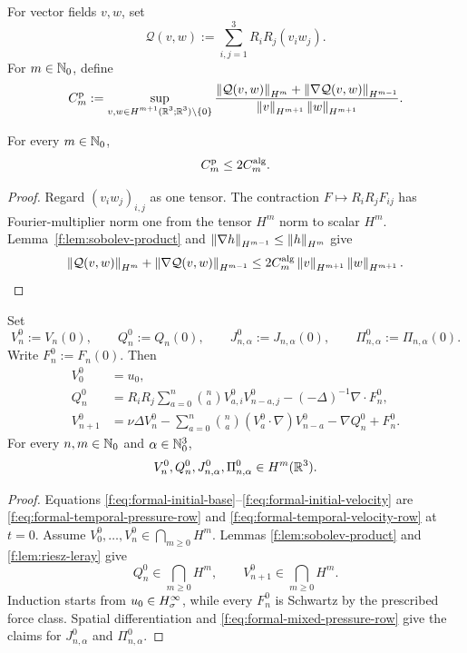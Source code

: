 \begin{definition}
\label{f:def:formal-canonical-bilinear-constants}
For vector fields \(v,w\), set
\[
 \mathcal Q(v,w):=\sum_{i,j=1}^3R_iR_j(v_i w_j).
\]
For \(m\in\mathbb N_0\), define
\[
 C_m^{\rm p}:=
 \sup_{\substack{
 v,w\in H^{m+1}(\mathbb R^3;\mathbb R^3)\setminus\{0\}}}
 \frac{
 \left\lVert \mathcal Q(v,w)\right\rVert_{H^m}
 +\left\lVert \nabla\mathcal Q(v,w)\right\rVert_{H^{m-1}}}
 {\left\lVert v\right\rVert_{H^{m+1}}\left\lVert w\right\rVert_{H^{m+1}}}.
\]
\end{definition}

\begin{lemma}
\label{f:lem:formal-canonical-bilinear-constants}
For every \(m\in\mathbb N_0\),
\[
 C_m^{\rm p}\le2C_m^{\rm alg}.
\]
\end{lemma}
\begin{proof}
Regard \((v_i w_j)_{i,j}\) as one tensor.  The contraction
\(F\mapsto R_iR_jF_{ij}\) has Fourier-multiplier norm one from the tensor
\(H^m\) norm to scalar \(H^m\).  Lemma~\ref{f:lem:sobolev-product} and
\(\left\lVert \nabla h\right\rVert_{H^{m-1}}\le\left\lVert h\right\rVert_{H^m}\) give
\[
 \left\lVert \mathcal Q(v,w)\right\rVert_{H^m}
 +\left\lVert \nabla\mathcal Q(v,w)\right\rVert_{H^{m-1}}
 \le2C_m^{\rm alg}\left\lVert v\right\rVert_{H^{m+1}}\left\lVert w\right\rVert_{H^{m+1}}.
\]
\end{proof}

\begin{lemma}
\label{f:lem:formal-initial-jet}
Set
\[
 V_n^0:=V_n(0),
 \qquad
 Q_n^0:=Q_n(0),
 \qquad
 J_{n,\alpha}^0:=J_{n,\alpha}(0),
 \qquad
 \Pi_{n,\alpha}^0:=\Pi_{n,\alpha}(0).
\]
Write \(F_n^0:=F_n(0)\).
Then
\begin{align}
 V_0^0&=u_0,
 \label{f:eq:formal-initial-base}\\
 Q_n^0
 &=R_iR_j
 \sum_{a=0}^{n}\binom naV_{a,i}^0V_{n-a,j}^0
 -(-\Delta)^{-1}\nabla\cdot F_n^0,
 \label{f:eq:formal-initial-pressure}\\
 V_{n+1}^0
 &=
 \nu\Delta V_n^0
 -\sum_{a=0}^{n}\binom na
 (V_a^0\cdot\nabla)V_{n-a}^0
 -\nabla Q_n^0+F_n^0.
 \label{f:eq:formal-initial-velocity}
\end{align}
For every \(n,m\in\mathbb N_0\) and \(\alpha\in\mathbb N_0^3\),
\[
 V_n^0,Q_n^0,J_{n,\alpha}^0,\Pi_{n,\alpha}^0\in H^m(\mathbb R^3).
\]
\par
\end{lemma}

\begin{proof}
Equations \eqref{f:eq:formal-initial-base}--\eqref{f:eq:formal-initial-velocity}
are \eqref{f:eq:formal-temporal-pressure-row} and
\eqref{f:eq:formal-temporal-velocity-row} at \(t=0\).  Assume
\(V_0^0,\ldots,V_n^0\in\bigcap_{m\ge0}H^m\).  Lemmas
\ref{f:lem:sobolev-product} and \ref{f:lem:riesz-leray} give
\[
 Q_n^0\in\bigcap_{m\ge0}H^m,
 \qquad
 V_{n+1}^0\in\bigcap_{m\ge0}H^m.
\]
Induction starts from \(u_0\in H^\infty_\sigma\), while every \(F_n^0\) is
Schwartz by the prescribed force class.  Spatial differentiation and
\eqref{f:eq:formal-mixed-pressure-row} give the claims for
\(J_{n,\alpha}^0\) and \(\Pi_{n,\alpha}^0\).
\end{proof}

